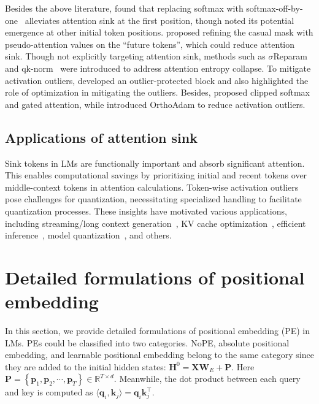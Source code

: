 \documentclass{article} \usepackage{iclr2025_conference,times}
\begin{document}
Besides the above literature, \citet{xiao2023efficient, kaul2024attention} found that replacing softmax with softmax-off-by-one~\citep{miller2023attention} alleviates attention sink at the first position, though \citet{xiao2023efficient} noted its potential emergence at other initial token positions. \citet{yin2024stablemask} proposed refining the casual mask with pseudo-attention values on the ``future tokens'', which could reduce attention sink. Though not explicitly targeting attention sink, methods such as $\sigma$Reparam~\citep{zhai2023stabilizing} and qk-norm~\citep{dehghani2023scaling} were introduced to address attention entropy collapse. To mitigate activation outliers, \citet{he2024understanding} developed an outlier-protected block and also highlighted the role of optimization in mitigating the outliers. Besides, \citet{bondarenko2023quantizable} proposed clipped softmax and gated attention, while \citet{kaul2024attention} introduced OrthoAdam to reduce activation outliers.





\vspace{-0.05cm}
\subsection{Applications of attention sink}
\vspace{-0.05cm}
Sink tokens in LMs are functionally important and absorb significant attention. This enables computational savings by prioritizing initial and recent tokens over middle-context tokens in attention calculations. Token-wise activation outliers pose challenges for quantization, necessitating specialized handling to facilitate quantization processes. These insights have motivated various applications, including streaming/long context generation~\citep{xiao2023efficient,han2024lm,yang2024seed}, KV cache optimization~\citep{ge2023model,wan2024look,wu2024layer}, efficient inference~\citep{zhang2024q,chen2024image}, model quantization~\citep{liu2024intactkv,huang2024slim}, and others.





\newpage
\section{Detailed formulations of positional embedding}\label{appendix_llm}

In this section, we provide detailed formulations of positional embedding (PE) in LMs. PEs could be classified into two categories. NoPE, absolute positional embedding, and learnable positional embedding belong to the same category since they are added to the initial hidden states: $\boldsymbol{H}^0=\boldsymbol{X}\boldsymbol{W}_E+\boldsymbol{P}$. Here $\boldsymbol{P}=\left\{\boldsymbol{p}_1\textrm{,}\,\boldsymbol{p}_2\textrm{,}\,\cdots\textrm{,}\,\boldsymbol{p}_T\right\}\in\mathbb{R}^{T\times d}$. Meanwhile, the dot product between each query and key is computed as  $\langle\boldsymbol{q}_i\textrm{,}\,\boldsymbol{k}_j\rangle=\boldsymbol{q}_i\boldsymbol{k}_j^\top$.
\end{document}
